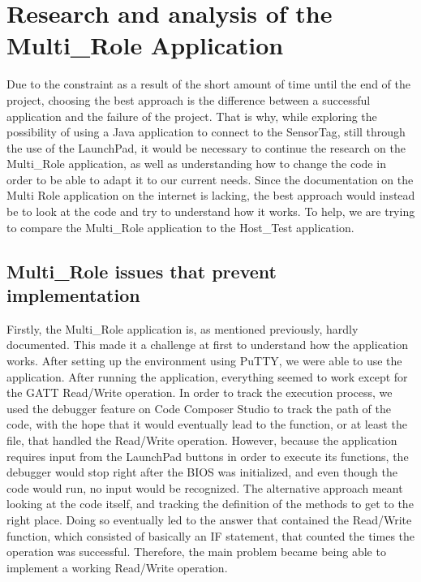 \documentclass[conference,12pt]{IEEETran}
\begin{document}
\section{Research and analysis of the Multi\_Role Application}
Due to the constraint as a result of the short amount of time until the end of the project, choosing the best approach is the difference between a successful application and the failure of the project. That is why, while exploring the possibility of using a Java application to connect to the SensorTag, still through the use of the LaunchPad, it would be necessary to continue the research on the Multi\_Role application, as well as understanding how to change the code in order to be able to adapt it to our current needs. Since the documentation on the Multi Role application on the internet is lacking, the best approach would instead be to look at the code and try to understand how it works. To help, we are trying to compare the Multi\_Role application to the Host\_Test application.\\

\subsection{Multi\_Role issues that prevent implementation}
Firstly, the Multi\_Role application is, as mentioned previously, hardly documented. This made it a challenge at first to understand how the application works. After setting up the environment using PuTTY, we were able to use the application. After running the application, everything seemed to work except for the GATT Read/Write operation. In order to track the execution process, we used the debugger feature on Code Composer Studio to track the path of the code, with the hope that it would eventually lead to the function, or at least the file, that handled the Read/Write operation. However, because the application requires input from the LaunchPad buttons in order to execute its functions, the debugger would stop right after the BIOS was initialized, and even though the code would run, no input would be recognized. The alternative approach meant looking at the code itself, and tracking the definition of the methods to get to the right place. Doing so eventually led to the answer that contained the Read/Write function, which consisted of basically an IF statement, that counted the times the operation was successful. Therefore, the main problem became being able to implement a working Read/Write operation.\\
\end{document}
